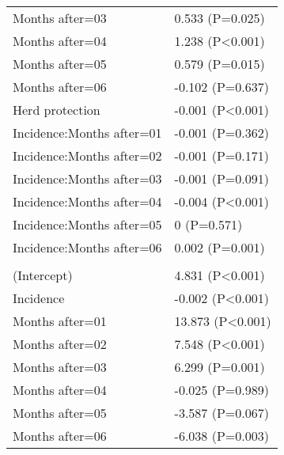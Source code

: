\documentclass[]{article}
\begin{document}
\begin{longtable}[t]{ll}
\hspace{1em}Months after=03 & 0.533 (P=0.025)\\
\hspace{1em}Months after=04 & 1.238 (P<0.001)\\
\hspace{1em}Months after=05 & 0.579 (P=0.015)\\
\hspace{1em}Months after=06 & -0.102 (P=0.637)\\
\hspace{1em}Herd protection & -0.001 (P<0.001)\\
\hspace{1em}Incidence:Months after=01 & -0.001 (P=0.362)\\
\hspace{1em}Incidence:Months after=02 & -0.001 (P=0.171)\\
\hspace{1em}Incidence:Months after=03 & -0.001 (P=0.091)\\
\hspace{1em}Incidence:Months after=04 & -0.004 (P<0.001)\\
\hspace{1em}Incidence:Months after=05 & 0 (P=0.571)\\
\hspace{1em}Incidence:Months after=06 & 0.002 (P=0.001)\\
\addlinespace[1.5em]
\multicolumn{2}{l}{\textbf{Temporary not field worker}}\\
\hspace{1em}(Intercept) & 4.831 (P<0.001)\\
\hspace{1em}Incidence & -0.002 (P<0.001)\\
\hspace{1em}Months after=01 & 13.873 (P<0.001)\\
\hspace{1em}Months after=02 & 7.548 (P<0.001)\\
\hspace{1em}Months after=03 & 6.299 (P=0.001)\\
\hspace{1em}Months after=04 & -0.025 (P=0.989)\\
\hspace{1em}Months after=05 & -3.587 (P=0.067)\\
\hspace{1em}Months after=06 & -6.038 (P=0.003)\\

\end{longtable}
\end{document}

